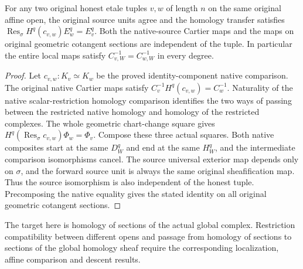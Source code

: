 \begin{theorem}
\label{thm:cartier-geometric-local-native-coordinate-independence}
\leanok
{}
For any two original honest etale tuples $v,w$ of length $n$ on the
same original affine open, the original source units agree and the
homology transfer satisfies $\operatorname{Res}_{\sigma}H^q(c_{v,w})E_w^q=E_v^q$.
Both the native-source Cartier maps and the maps on original geometric
cotangent sections are independent of the tuple. In particular the
entire local maps satisfy $C_{v,W}^{-1}=C_{w,W}^{-1}$ in every degree.
\end{theorem}
\begin{proof}
Let $c_{v,w}:K_v\simeq K_w$ be the proved identity-component native
comparison. The original native Cartier maps satisfy
$C_v^{-1}H^q(c_{v,w})=C_w^{-1}$. Naturality of the native
scalar-restriction homology comparison identifies the two ways of
passing between the restricted native homology and homology of the
restricted complexes. The whole geometric chart-change square gives
$H^q(\operatorname{Res}_{\sigma}c_{v,w})\Phi_w=\Phi_v$.
Compose these three actual squares. Both native composites start at the same $D_W^q$ and end at the same
$H_W^q$, and the intermediate comparison isomorphisms cancel. The
source universal exterior map depends only on $\sigma$, and the
forward source unit is always the same original sheafification map.
Thus the source isomorphism is also independent of the honest tuple.
Precomposing the native equality gives the stated identity on all
original geometric cotangent sections.
\end{proof}

The target here is homology of sections of the actual global complex.
Restriction compatibility between different opens and passage from
homology of sections to sections of the global homology sheaf require
the corresponding localization, affine comparison and descent results.
